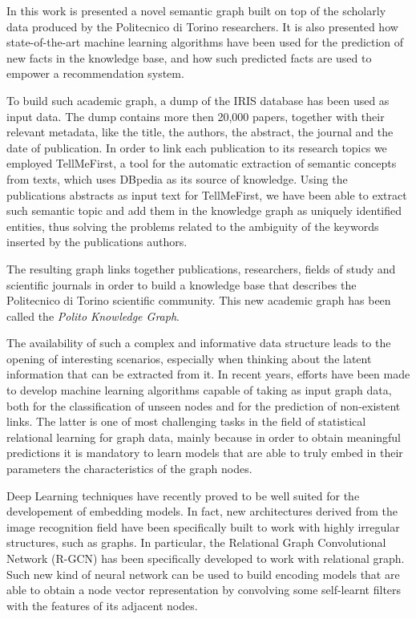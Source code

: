 \documentclass[english, 12pt]{article}
\begin{document}
In this work is presented a novel semantic graph built on top of the
scholarly data produced by the Politecnico di Torino researchers.
It is also presented how state-of-the-art machine learning algorithms
have been used for the prediction of new facts in the knowledge base, and
how such predicted facts are used to empower a recommendation system.

To build such academic graph, a dump of the IRIS database has been used
as input data.
The dump contains more then 20,000 papers, together with their relevant
metadata, like the title, the authors, the abstract, the journal and the
date of publication.
In order to link each publication to its research topics we employed
TellMeFirst, a tool for the automatic extraction of semantic
concepts from texts, which uses DBpedia as its source of knowledge.
Using the publications abstracts as input text for TellMeFirst, we
have been able to extract such semantic topic and add them in the knowledge
graph as uniquely identified entities, thus solving the problems related to the
ambiguity of the keywords inserted by the publications authors.

The resulting graph links together publications, researchers, fields of study
and scientific journals in order to build a knowledge base that describes
the Politecnico di Torino scientific community.
This new academic graph has been called the \emph{Polito Knowledge Graph}.

The availability of such a complex and informative data structure leads
to the opening of interesting scenarios, especially when thinking about
the latent information that can be extracted from it.
In recent years, efforts have been made to develop machine learning
algorithms capable of taking as input graph data, both for the classification
of unseen nodes and for the prediction of non-existent links.
The latter is one of most challenging tasks in the field of statistical
relational learning for graph data, mainly because in order to obtain
meaningful predictions it is mandatory to learn models that are able to
truly embed in their parameters the characteristics of the graph nodes.

Deep Learning techniques have recently proved to be well suited for
the developement of embedding models. In fact, new architectures derived from the
image recognition field have been specifically built to work with highly
irregular structures, such as graphs.
In particular, the Relational Graph Convolutional Network (R-GCN) has been
specifically developed to work with relational graph.
Such new kind of neural network can be used to build encoding models that are able to
obtain a node vector representation by convolving some self-learnt filters with
the features of its adjacent nodes.
\end{document}
